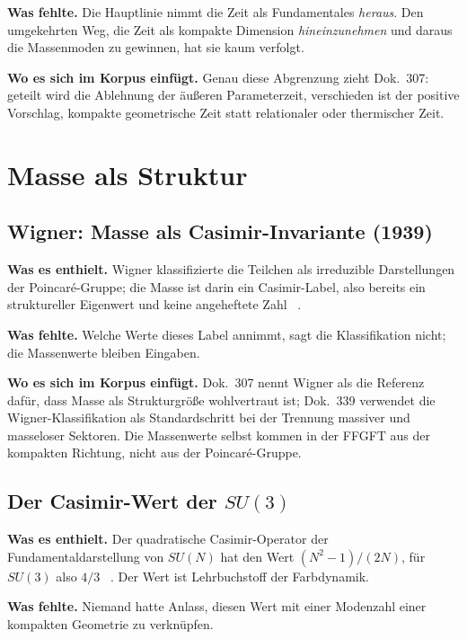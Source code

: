 \textbf{Was fehlte.} Die Hauptlinie nimmt die Zeit als Fundamentales \emph{heraus}. Den umgekehrten
Weg, die Zeit als kompakte Dimension \emph{hineinzunehmen} und daraus die Massenmoden zu gewinnen,
hat sie kaum verfolgt.

\textbf{Wo es sich im Korpus einfügt.} Genau diese Abgrenzung zieht Dok.~307: geteilt wird die
Ablehnung der äußeren Parameterzeit, verschieden ist der positive Vorschlag, kompakte geometrische
Zeit statt relationaler oder thermischer Zeit.

\section{Masse als Struktur}

\subsection{Wigner: Masse als Casimir-Invariante (1939)}

\textbf{Was es enthielt.} Wigner klassifizierte die Teilchen als irreduzible Darstellungen der
Poincaré-Gruppe; die Masse ist darin ein Casimir-Label, also bereits ein struktureller Eigenwert
und keine angeheftete Zahl \EM~\cite{Wigner1939}.

\textbf{Was fehlte.} Welche Werte dieses Label annimmt, sagt die Klassifikation nicht; die
Massenwerte bleiben Eingaben.

\textbf{Wo es sich im Korpus einfügt.} Dok.~307 nennt Wigner als die Referenz dafür, dass Masse als
Strukturgröße wohlvertraut ist; Dok.~339 verwendet die Wigner-Klassifikation als Standardschritt
bei der Trennung massiver und masseloser Sektoren. Die Massenwerte selbst kommen in der FFGFT aus
der kompakten Richtung, nicht aus der Poincaré-Gruppe.

\subsection{Der Casimir-Wert der $SU(3)$}

\textbf{Was es enthielt.} Der quadratische Casimir-Operator der Fundamentaldarstellung von $SU(N)$
hat den Wert $(N^2-1)/(2N)$, für $SU(3)$ also $4/3$ \EM~\cite{Georgi1999}. Der Wert ist Lehrbuchstoff
der Farbdynamik.

\textbf{Was fehlte.} Niemand hatte Anlass, diesen Wert mit einer Modenzahl einer kompakten
Geometrie zu verknüpfen.

